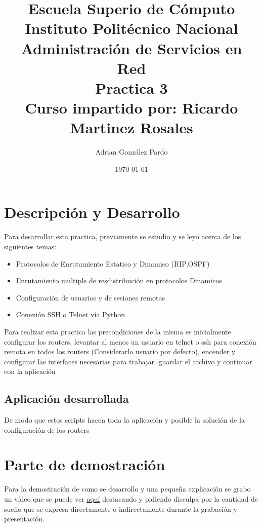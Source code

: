 \documentclass[10pt]{article}
\title{Escuela Superio de Cómputo\\Instituto Politécnico Nacional\\Administración de Servicios en Red\\Practica 3\\Curso impartido por: Ricardo Martinez Rosales}
\author{Adrian González Pardo}
\date{\today}
\begin{document}
\maketitle
\section{Descripción y Desarrollo}
Para desarrollar esta practica, previamente se estudio y se leyo acerca de los siguientes temas:
\begin{itemize}
  \item Protocolos de Enrutamiento Estatico y Dinamico (RIP,OSPF)
  \item Enrutamiento multiple de resdistribución en protocolos Dinamicos
  \item Configuración de usuarios y de sesiones remotas
  \item Conexión SSH o Telnet vía Python
\end{itemize}
Para realizar esta practica las precondiciones de la misma es inicialmente configurar los routers, levantar al menos un usuario en telnet o ssh para conexión remota en todos los routers (Considerarlo usuario por defecto), encender y configurar las interfaces necesarias para trabajar. guardar el archivo y continuar con la aplicación
\subsection{Aplicación desarrollada}
\begin{center}
  
  
  
  
\end{center}
De modo que estos scripts hacen toda la aplicación y posible la solución de la configuración de los routers

\section{Parte de demostración}
Para la demostración de como se desarrollo y una pequeña explicación se grabo un vídeo que se puede ver \underline{\href{https://youtu.be/bnYkfwaPU50}{aquí}} destacando y pidiendo disculpa por la cantidad de sueño que se expresa directamente o indirectamente durante la grabación y presentación.
\end{document}
